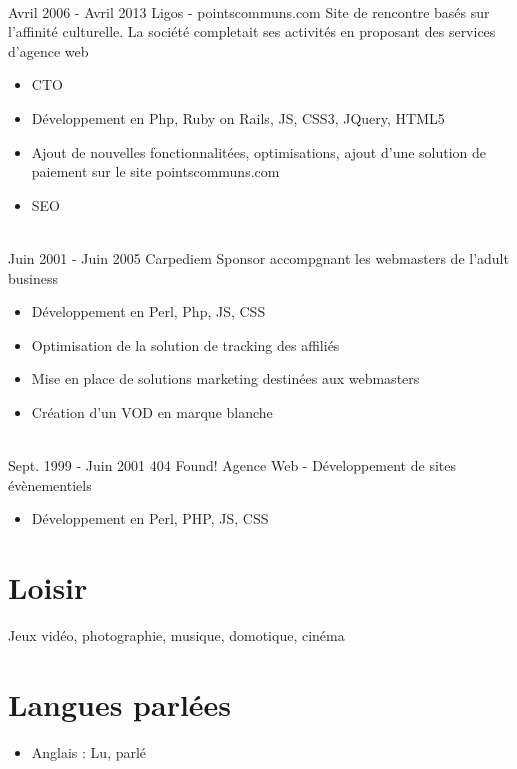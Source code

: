\documentclass[letterpaper]{twentysecondcv} %
\begin{document}
\begin{twenty}
    
     \\   
    \twentyitem
   		{Avril 2006 - }
		{Avril 2013}
        {Ligos - pointscommuns.com}
        {}
        {Site de rencontre basés sur l'affinité culturelle. La société completait ses activités en proposant des services d'agence web}
        {
        {\begin{itemize}
        \item CTO
        \item Développement en Php, Ruby on Rails, JS, CSS3, JQuery, HTML5
        \item Ajout de nouvelles fonctionnalitées, optimisations, ajout d'une solution de paiement sur le site pointscommuns.com
        \item SEO


    \end{itemize}}
        }
        
\end{twenty}

\begin{twenty}        
    
     \\   
    \twentyitem
   		{Juin 2001 - }
		{Juin 2005}
        {Carpediem}
        {}
        {Sponsor accompgnant les webmasters de l'adult business}
        {
        {\begin{itemize}
        \item Développement en Perl, Php, JS, CSS
        \item Optimisation de la solution de tracking des affiliés
        \item Mise en place de solutions marketing destinées aux webmasters
        \item Création d'un VOD en marque blanche

    \end{itemize}}
        }

\end{twenty}

\begin{twenty}
       
    \\   
    \twentyitem
   		{Sept. 1999 - }
		{Juin 2001}
        {404 Found!}
        {}
        {Agence Web - Développement de sites évènementiels}
        {
        {\begin{itemize}
        \item Développement en Perl, PHP, JS, CSS
        \end{itemize}}
        }
        
\end{twenty}



\section{Loisir}
Jeux vidéo, photographie, musique, domotique, cinéma

\section{Langues parlées}
\begin{itemize}
\item Anglais : Lu, parlé
\end{itemize}
\end{document}
